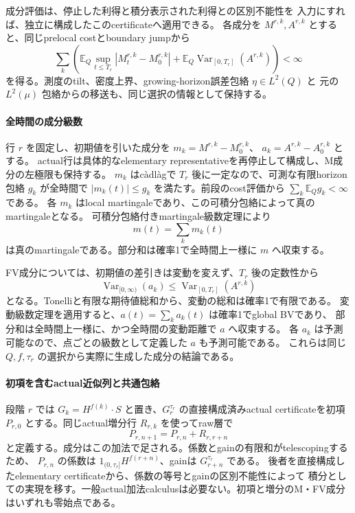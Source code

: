 成分評価は、停止した利得と積分表示された利得との区別不能性を
入力にすれば、独立に構成したこのcertificateへ適用できる。
各成分を $M^{r,k},A^{r,k}$ とすると、同じprelocal costとboundary jumpから
\[
 \sum_k\left(
 \mathbb E_Q\sup_{t\le T_r}|M^{r,k}_t-M^{r,k}_0|
 +\mathbb E_Q\operatorname{Var}_{[0,T_r]}(A^{r,k})\right)<\infty
\]
を得る。測度のtilt、密度上界、growing-horizon誤差包絡 $\eta\in L^2(Q)$ と
元の $L^2(\mu)$ 包絡からの移送も、同じ選択の情報として保持する。

\paragraph{全時間の成分級数}
行 $r$ を固定し、初期値を引いた成分を $m_k=M^{r,k}-M^{r,k}_0$、
$a_k=A^{r,k}-A^{r,k}_0$ とする。
actual行は具体的なelementary representativeを再停止して構成し、M成分の左極限も保持する。
$m_k$ はcàdlàgで $T_r$ 後に一定なので、可測な有限horizon包絡 $g_k$ が全時間で
$|m_k(t)|\le g_k$ を満たす。前段のcost評価から $\sum_k\mathbb E_Qg_k<\infty$ である。
各 $m_k$ はlocal martingaleであり、この可積分包絡によって真のmartingaleとなる。
可積分包絡付きmartingale級数定理により
\[
 m(t)=\sum_k m_k(t)
\]
は真のmartingaleである。部分和は確率1で全時間上一様に $m$ へ収束する。

FV成分については、初期値の差引きは変動を変えず、$T_r$ 後の定数性から
\[
 \operatorname{Var}_{[0,\infty)}(a_k)
 \le\operatorname{Var}_{[0,T_r]}(A^{r,k})
\]
となる。Tonelliと有限な期待値総和から、変動の総和は確率1で有限である。
変動級数定理を適用すると、$a(t)=\sum_k a_k(t)$ は確率1でglobal BVであり、
部分和は全時間上一様に、かつ全時間の変動距離で $a$ へ収束する。
各 $a_k$ は予測可能なので、点ごとの級数として定義した $a$ も予測可能である。
これらは同じ $Q,f,\tau_r$ の選択から実際に生成した成分の結論である。

\paragraph{初項を含むactual近似列と共通包絡}
段階 $r$ では $G_k=H^{f(k)}\cdot S$ と置き、$G_r^{\tau_r}$ の直接構成済みactual
certificateを初項 $P_{r,0}$ とする。同じactual増分行 $R_{r,k}$ を使ってraw層で
\[
 P_{r,n+1}=P_{r,n}+R_{r,r+n}
\]
と定義する。成分はこの加法で足される。係数とgainの有限和がtelescopingするため、
$P_{r,n}$ の係数は $1_{(0,\tau_r]}H^{f(r+n)}$、gainは $G_{r+n}^{\tau_r}$ である。
後者を直接構成したelementary certificateから、係数の等号とgainの区別不能性によって
積分としての実現を移す。一般actual加法calculusは必要ない。初項と増分のM・FV成分はいずれも零始点である。

